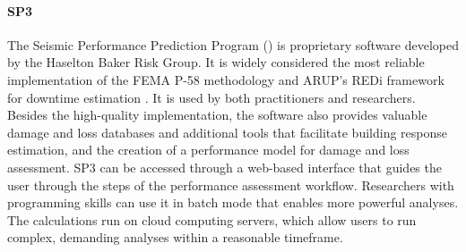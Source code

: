 \paragraph{SP3} The Seismic Performance Prediction Program () is proprietary software developed by the Haselton Baker Risk Group. It is widely considered the most reliable implementation of the FEMA P-58 methodology and ARUP's REDi framework for downtime estimation \citep{arup2013resiliencebased}. It is used by both practitioners and researchers. Besides the high-quality implementation, the software also provides valuable damage and loss databases and additional tools that facilitate building response estimation, and the creation of a performance model for damage and loss assessment. SP3 can be accessed through a web-based interface that guides the user through the steps of the performance assessment workflow. Researchers with programming skills can use it in batch mode that enables more powerful analyses. The calculations run on cloud computing servers, which allow users to run complex, demanding analyses within a reasonable timeframe.

